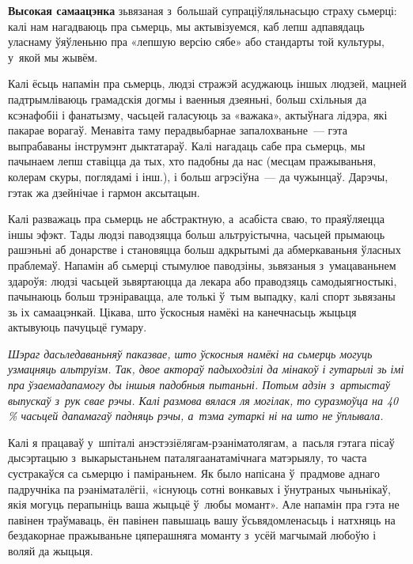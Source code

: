 \textbf{Высокая самаацэнка} зьвязаная з~большай супраціўляльнасьцю страху сьмерці: калі нам нагадваюць пра сьмерць, мы актывізуемся, каб лепш адпавядаць уласнаму ўяўленьню пра «лепшую версію сябе» або стандарты той культуры, у~якой мы жывём.

Калі ёсьць напамін пра сьмерць, людзі стражэй асуджаюць іншых людзей, мацней падтрымліваюць грамадскія догмы і ваенныя дзеяньні, больш схільныя да ксэнафобіі і фанатызму, часьцей галасуюць за «важака», актыўнага лідэра, які пакарае ворагаў. Менавіта таму перадвыбарнае запалохваньне~--- гэта выпрабаваны інструмэнт дыктатараў. Калі нагадаць сабе пра сьмерць, мы пачынаем лепш ставіцца да тых, хто падобны да нас (месцам пражываньня, колерам скуры, поглядамі і інш.), і больш агрэсіўна~--- да чужынцаў. Дарэчы, гэтак жа дзейнічае і гармон аксытацын. 


Калі разважаць пра сьмерць не абстрактную, а~асабіста сваю, то праяўляецца іншы эфэкт. Тады людзі паводзяцца больш альтруістычна, часьцей прымаюць рашэньні аб донарстве і становяцца больш адкрытымі да абмеркаваньня ўласных праблемаў. Напамін аб сьмерці стымулюе паводзіны, зьвязаныя з~умацаваньнем здароўя: людзі часьцей зьвяртаюцца да лекара або праводзяць самодыягностыкі, пачынаюць больш трэніравацца, але толькі ў~тым выпадку, калі спорт зьвязаны зь іх самаацэнкай. Цікава, што ўскосныя намёкі на канечнасьць жыцьця актывуюць пачуцьцё гумару.

\emph{Шэраг дасьледаваньняў паказвае, што ўскосныя намёкі на сьмерць могуць узмацняць альтруізм. Так, двое актораў падыходзілі да мінакоў і гутарылі зь імі пра ўзаемадапамогу ды іншыя падобныя пытаньні. Потым адзін з~артыстаў выпускаў з~рук свае рэчы. Калі размова вялася ля могілак, то суразмоўца на 40\,\% часьцей дапамагаў падняць рэчы, а~тэма гутаркі ні на што не ўплывала.}

Калі я працаваў у~шпіталі анэстэзіёлягам-рэаніматолягам, а~пасьля гэтага пісаў дысэртацыю з~выкарыстаньнем паталягаанатамічнага матэрыялу, то часта сустракаўся са сьмерцю і паміраньнем. Як было напісана ў~прадмове аднаго падручніка па рэаніматалёгіі, «існуюць сотні вонкавых і ўнутраных чыньнікаў, якія могуць перапыніць ваша жыцьцё ў~любы момант». Але напамін пра гэта не павінен траўмаваць, ён павінен павышаць вашу ўсьвядомленасьць і натхняць на бездакорнае пражываньне цяперашняга моманту з~усёй магчымай любоўю і воляй да жыцьця.

